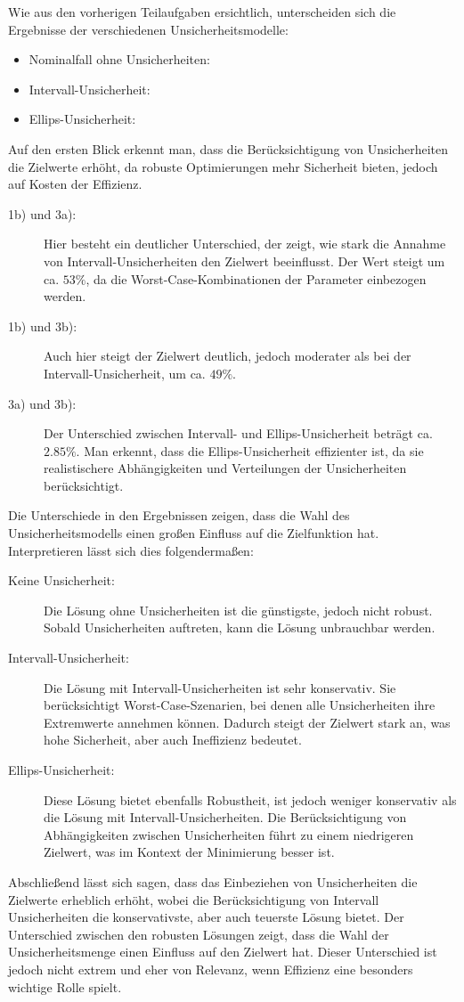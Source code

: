 \documentclass[a4paper,12pt]{article}
\begin{document}
Wie aus den vorherigen Teilaufgaben ersichtlich, unterscheiden sich die Ergebnisse der verschiedenen Unsicherheitsmodelle:
\begin{itemize}
    \item Nominalfall ohne Unsicherheiten: 
    \item Intervall-Unsicherheit: 
    \item Ellips-Unsicherheit: 
\end{itemize}
Auf den ersten Blick erkennt man, dass die Ber\"ucksichtigung von Unsicherheiten die Zielwerte erh\"oht, da robuste Optimierungen mehr Sicherheit bieten, jedoch auf Kosten der Effizienz.
\begin{description}
    \item[1b) und 3a):] Hier besteht ein deutlicher Unterschied, der zeigt, wie stark die Annahme von Intervall-Unsicherheiten den Zielwert beeinflusst. Der Wert steigt um ca. $53 \%$, da die Worst-Case-Kombinationen der Parameter einbezogen werden.
    \item[1b) und 3b):] Auch hier steigt der Zielwert deutlich, jedoch moderater als bei der Intervall-Unsicherheit, um ca. $49 \%$. 
    \item[3a) und 3b):] Der Unterschied zwischen Intervall- und Ellips-Unsicherheit betr\"agt ca. $2.85\%$. Man erkennt, dass die Ellips-Unsicherheit effizienter ist, da sie realistischere Abh\"angigkeiten und Verteilungen der Unsicherheiten ber\"ucksichtigt.
\end{description}
Die Unterschiede in den Ergebnissen zeigen, dass die Wahl des Unsicherheitsmodells einen gro\ss en Einfluss auf die Zielfunktion hat. Interpretieren l\"asst sich dies folgenderma\ss en: 
\begin{description}
    \item[Keine Unsicherheit:] Die L\"osung ohne Unsicherheiten ist die g\"unstigste, jedoch nicht robust. Sobald Unsicherheiten auftreten, kann die L\"osung unbrauchbar werden.
    \item[Intervall-Unsicherheit:] Die L\"osung mit Intervall-Unsicherheiten ist sehr konservativ. Sie ber\"ucksichtigt Worst-Case-Szenarien, bei denen alle Unsicherheiten ihre Extremwerte annehmen k\"onnen. Dadurch steigt der Zielwert stark an, was hohe Sicherheit, aber auch Ineffizienz bedeutet.
    \item[Ellips-Unsicherheit:] Diese L\"osung bietet ebenfalls Robustheit, ist jedoch weniger konservativ als die L\"osung mit Intervall-Unsicherheiten. Die Ber\"ucksichtigung von Abh\"angigkeiten zwischen Unsicherheiten f\"uhrt zu einem niedrigeren Zielwert, was im Kontext der Minimierung besser ist.
\end{description}
Abschlie\ss end l\"asst sich sagen, dass das Einbeziehen von Unsicherheiten die Zielwerte erheblich erh\"oht, wobei die Ber\"ucksichtigung von Intervall Unsicherheiten die konservativste, aber auch teuerste L\"osung bietet. Der Unterschied zwischen den robusten L\"osungen zeigt, dass die Wahl der Unsicherheitsmenge einen Einfluss auf den Zielwert hat. Dieser Unterschied ist jedoch nicht extrem und eher von Relevanz, wenn Effizienz eine besonders wichtige Rolle spielt.
\end{document}
